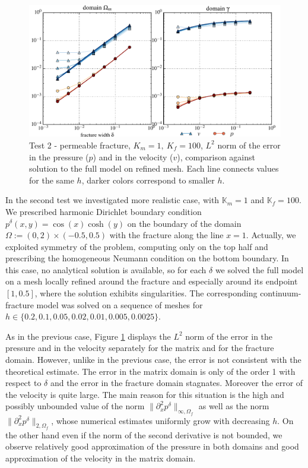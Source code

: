 \documentclass{llncs}
\def\prtl{\partial}
\def\tn#1{{\mathbb{#1}}}    %
\def\norm#1{\|#1\|}
\begin{document}
\begin{figure}
\centering
\includegraphics[scale=0.6]{figures/plot_num_cos_cosh_color.pdf}
\caption{Test 2 - permeable fracture, $K_m=1,\ K_f=100$, $L^2$ norm of the error in the pressure ($p$) and in the velocity ($v$), 
         comparison against solution to the full model on refined mesh.
         Each line connects values for the same $h$, darker colors correspond to smaller $h$.}
\label{fig:cos_cosh}
\end{figure}


In the second test we investigated more realistic case, with $\tn K_m=1$ and $\tn K_f=100$. We prescribed harmonic Dirichlet boundary condition 
$p^\delta(x,y) = \cos(x)\cosh(y)$ on the boundary of the domain $\Omega:=(0,2)\times(-0.5,0.5)$ with the fracture along the line $x=1$.
Actually, we exploited symmetry of the problem, computing only on the top half and prescribing the homogeneous 
Neumann condition on the bottom boundary. In this case, no analytical solution is available, so for each $\delta$ we solved the full model on a mesh locally refined 
around the fracture and especially around its endpoint $[1, 0.5]$, where the solution exhibits singularities. The corresponding continuum-fracture model was solved 
on a sequence of meshes for $h\in\{0.2, 0.1, 0.05, 0.02, 0.01, 0.005, 0.0025\}$.

As in the previous case, Figure \ref{fig:cos_cosh} displays the $L^2$ norm of the error in the pressure and in the velocity separately for 
the matrix and for the fracture domain. However, unlike in the previous case, the error is not consistent with the theoretical estimate. 
The error in the matrix domain is only of the order 1 with respect to $\delta$ and the error in the fracture domain stagnates. Moreover 
the error of the velocity is quite large. The main reason for this situation is the high and possibly unbounded value of the norm $\norm{\prtl^2_x p^\delta}_{\infty,\Omega_f}$
as well as the norm $\norm{\prtl^2_x p^\delta}_{2,\Omega_f}$,
whose numerical estimates uniformly grow with decreasing $h$.
On the other hand even if the norm of the second derivative is not bounded, we observe relatively good approximation of the pressure in both domains
and good approximation of the velocity in the matrix domain.
\end{document}

